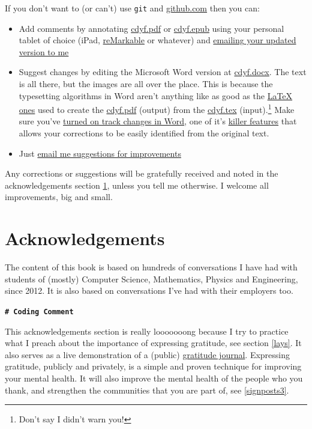 \documentclass[
]{book}
\providecommand{\tightlist}{%
  \setlength{\itemsep}{0pt}\setlength{\parskip}{0pt}}
\begin{document}
If you don't want to (or can't) use \texttt{git} and \href{https://github.com/}{github.com} then you can:

\begin{itemize}
\tightlist
\item
  Add comments by annotating \href{https://www.cdyf.me/cdyf.pdf}{cdyf.pdf} or \href{https://cdyf.me/cdyf.epub}{cdyf.epub} using your personal tablet of choice (iPad, \href{https://en.wikipedia.org/wiki/ReMarkable}{reMarkable} or whatever) and \href{https://personalpages.manchester.ac.uk/staff/duncan.hull/contact}{emailing your updated version to me}
\item
  Suggest changes by editing the Microsoft Word version at \href{http://cdyf.me/cdyf.docx}{cdyf.docx}. The text is all there, but the images are all over the place. This is because the typesetting algorithms in Word aren't anything like as good as the \href{https://latex4year1.netlify.app/}{LaTeX ones} used to create the \href{https://www.cdyf.me/cdyf.pdf}{cdyf.pdf} (output) from the \href{https://github.com/dullhunk/cdyf/blob/master/_book/cdyf.tex}{cdyf.tex} (input).\footnote{Don't say I didn't warn you!} Make sure you've \href{https://support.microsoft.com/en-us/office/track-changes-in-word-197ba630-0f5f-4a8e-9a77-3712475e806a}{turned on track changes in Word}, one of it's \href{https://en.wikipedia.org/wiki/Killer_feature}{killer features} that allows your corrections to be easily identified from the original text.
\item
  Just \href{https://personalpages.manchester.ac.uk/staff/duncan.hull/contact}{email me suggestions for improvements}
\end{itemize}

Any corrections or suggestions will be gratefully received and noted in the acknowledgements section \ref{thanks}, unless you tell me otherwise. I welcome all improvements, big and small.

\hypertarget{thanks}{%
\section{Acknowledgements}\label{thanks}}

The content of this book is based on hundreds of conversations I have had with students of (mostly) Computer Science, Mathematics, Physics and Engineering, since 2012. It is also based on conversations I've had with their employers too.

\textbf{\texttt{\#\ Coding\ Comment}}

This acknowledgements section is really looooooong because I try to practice what I preach about the importance of expressing gratitude, see section \ref{lays}. It also serves as a live demonstration of a (public) \href{https://en.wikipedia.org/wiki/Gratitude_journal}{gratitude journal}. Expressing gratitude, publicly and privately, is a simple and proven technique for improving your mental health. It will also improve the mental health of the people who you thank, and strengthen the communities that you are part of, see \ref{signposts3}.
\end{document}
